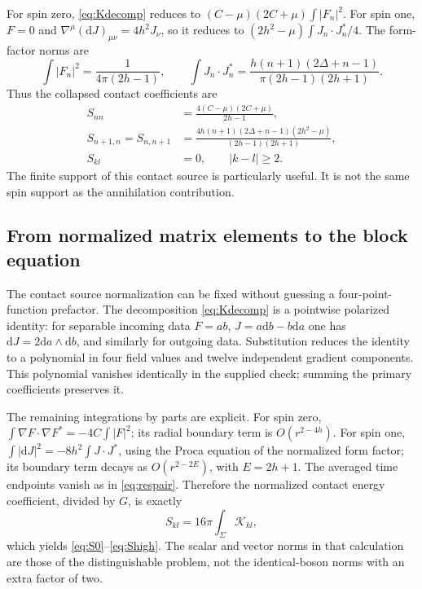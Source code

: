 \documentclass[11pt,a4paper]{article}
\numberwithin{equation}{section}
\theoremstyle{remark}\newtheorem{remark}[theorem]{Remark}
\newcommand{\dd}{\mathrm d}
\begin{document}
For spin zero, \eqref{eq:Kdecomp} reduces to
$(C-\mu)(2C+\mu)\int|F_n|^2$. For spin one, $F=0$ and
$\nabla^\mu(\dd J)_{\mu\nu}=4h^2J_\nu$, so it reduces to
$(2h^2-\mu)\int J_n\cdot J_n^*/4$. The form-factor norms are
\begin{equation}
 \int|F_n|^2=\frac1{4\pi(2h-1)},\qquad
 \int J_n\cdot J_n^*=\frac{h(n+1)(2\Delta+n-1)}{\pi(2h-1)(2h+1)}.
\end{equation}
Thus the collapsed contact coefficients are
\begin{align}
 S_{nn}&=\frac{4(C-\mu)(2C+\mu)}{2h-1},\label{eq:S0}\\
 S_{n+1,n}=S_{n,n+1}
 &=\frac{4h(n+1)(2\Delta+n-1)(2h^2-\mu)}{(2h-1)(2h+1)},\label{eq:S1}\\
 S_{kl}&=0,\qquad |k-l|\geq2.\label{eq:Shigh}
\end{align}
The finite support of this contact source is particularly useful. It is not the same spin support as the annihilation contribution.

\subsection{From normalized matrix elements to the block equation}
\label{sec:lognormalization}

The contact source normalization can be fixed without guessing a four-point-function prefactor. The decomposition \eqref{eq:Kdecomp} is a pointwise polarized identity: for separable incoming data $F=ab$, $J=a\dd b-b\dd a$ one has $\dd J=2\dd a\wedge\dd b$, and similarly for outgoing data. Substitution reduces the identity to a polynomial in four field values and twelve independent gradient components. This polynomial vanishes identically in the supplied check; summing the primary coefficients preserves it.

The remaining integrations by parts are explicit. For spin zero,
$\int\nabla F\cdot\nabla F^*=-4C\int|F|^2$; its radial boundary term is $O(r^{2-4h})$. For spin one,
$\int|\dd J|^2=-8h^2\int J\cdot J^*$, using the Proca equation of the normalized form factor; its boundary term decays as $O(r^{2-2E})$, with $E=2h+1$. The averaged time endpoints vanish as in \eqref{eq:respair}. Therefore the normalized contact energy coefficient, divided by $G$, is exactly
\begin{equation}
 S_{kl}=16\pi\int_\Sigma\mathcal K_{kl},
 \label{eq:sourceunits}
\end{equation}
which yields \eqref{eq:S0}--\eqref{eq:Shigh}. The scalar and vector norms in that calculation are those of the distinguishable problem, not the identical-boson norms with an extra factor of two.
\end{document}
